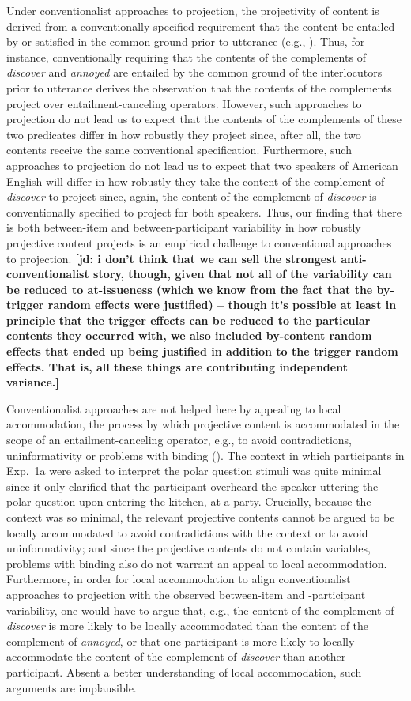 \documentclass[11pt,fleqn]{article}
\newcommand{\6}{\mbox{$[\hspace*{-.6mm}[$}}
\newcommand{\9}{\mbox{$]\hspace*{-.6mm}]$}}
\newcommand{\jd}[1]{\textbf{\color{Green}[jd: #1]}}
\begin{document}
Under conventionalist approaches to projection, the projectivity of content is derived from a conventionally specified requirement that the content be entailed by or satisfied in the common ground prior to utterance (e.g., \citealt{heim83,vds92}). Thus, for instance, conventionally requiring that the contents of the complements of {\em discover} and {\em annoyed} are entailed by the common ground of the interlocutors prior to utterance derives the observation that the contents of the complements project over entailment-canceling operators. However, such approaches to projection do not lead us to expect that the contents of the complements of these two predicates differ in how robustly they project since, after all, the two contents receive the same conventional specification. Furthermore, such approaches to projection do not lead us to expect that two speakers of American English will differ in how robustly they take the content of the complement of {\em discover} to project since, again, the content of the complement of {\em discover} is conventionally specified to project for both speakers. Thus, our finding that there is both between-item and between-participant variability in how robustly projective content projects is an empirical challenge to conventional approaches to projection. \jd{i don't think that we can sell the strongest anti-conventionalist story, though, given that not all of the variability can be reduced to at-issueness (which we know from the fact that the by-trigger random effects were justified) -- though it's possible at least in principle that the trigger effects can be reduced to the particular contents they occurred with, we also included by-content random effects that ended up being justified in addition to the trigger random effects. That is, all these things are contributing independent variance.}

Conventionalist approaches are not helped here by appealing to local accommodation, the process by which projective content is accommodated in the scope of an entailment-canceling operator, e.g., to avoid contradictions, uninformativity or problems with binding (\citealt{heim83,vds92}). The context in which participants in Exp.~1a were asked to interpret the polar question stimuli was quite minimal since it only clarified that the participant overheard the speaker uttering the polar question upon entering the kitchen, at a party. Crucially, because the context was so minimal, the relevant projective contents cannot be argued to be locally accommodated to avoid contradictions with the context or to avoid uninformativity; and since the projective contents do not contain variables, problems with binding also do not warrant an appeal to local accommodation. Furthermore, in order for local accommodation to align conventionalist approaches to projection with the observed between-item and -participant variability, one would have to argue that, e.g., the content of the complement of {\em discover} is more likely to be locally accommodated than the content of the complement of {\em annoyed}, or that one participant is more likely to locally accommodate the content of the complement of {\em discover} than another participant. Absent a better understanding of local accommodation, such arguments are implausible. 
\end{document}
